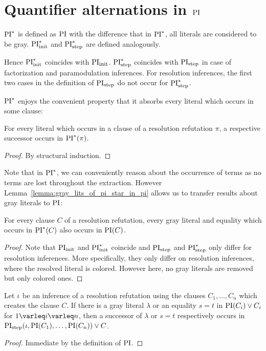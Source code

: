 \documentclass[%
	draft=false,%
	numbers=noendperiod,%
	11pt,%
	a4paper,%
	oneside,%
	openany,%
]{memoir}
\begin{document}
\section{Quantifier alternations in $\operatorname{PI}$}


\begin{defi}[$\PI^*$]
	$\PI^*$ is defined as $\operatorname{PI}$ with the difference that in $\PI^*$, all literals are considered to be gray.
	$\operatorname{PI}_{\mathrm{init}}^*$ and $\operatorname{PI}_{\mathrm{step}}^*$ are defined analogously.
\end{defi}

Hence $\operatorname{PI}_{\mathrm{init}}^*$ coincides with $\operatorname{PI}_{\mathrm{init}}$.
$\operatorname{PI}_{\mathrm{step}}^*$ coincides with $\operatorname{PI}_{\mathrm{step}}$ in case of factorization and paramodulation inferences.
For resolution inferences, the first two cases in the definition of $\operatorname{PI}_{\mathrm{step}}$ do not occur for $\operatorname{PI}_{\mathrm{step}}^*$.

$\PI^*$ enjoys the convenient property that it absorbs every literal which occurs in some clause:

\begin{prop}
	\label{prop:every_lit_in_pi_star}
	For every literal which occurs in a clause of a resolution refutation $\pi$, a respective successor occurs in $\operatorname{PI}^*(\pi)$.
\end{prop}
\begin{proof}
	By structural induction.
\end{proof}

Note that in $\PI^*$, we can conveniently reason about the occurrence of terms as no terms are lost throughout the extraction.
However Lemma~\ref{lemma:gray_lits_of_pi_star_in_pi} allows us to transfer results about gray literals to $\operatorname{PI}$:

\begin{lemma}
	\label{lemma:gray_lits_of_pi_star_in_pi}
	For every clause $C$ of a resolution refutation,
	every gray literal and equality which occurs in $\operatorname{PI}^*(C)$ also occurs in $\operatorname{PI}(C)$.
\end{lemma}
\begin{proof}
	Note that $\operatorname{PI}_{\mathrm{init}}$ and $\operatorname{PI}_{\mathrm{init}}^*$ coincide and $\operatorname{PI}_{\mathrm{step}}$ and $\operatorname{PI}_{\mathrm{step}}^*$ only differ for resolution inferences.
	More specifically, they only differ on resolution inferences, where the resolved literal is colored. However here, no gray literals are removed but only colored ones.
\end{proof}


\begin{lemma}
	\label{lemma:Ot8Gie7y}
	Let $\iota$ be an inference of a resolution refutation using the clauses $C_1, \dots, C_n$ which creates the clause $C$.
	If there is a gray literal $\lambda$ or an equality $s=t$ in $\operatorname{PI}(C_i) \lor C_i$ for $1 \varleq i \varleq n$, 
	then a successor of $\lambda$ or $s=t$ respectively occurs in $\operatorname{PI}_{\mathrm{step}}(\iota, \operatorname{PI}(C_1), \dots, \operatorname{PI}(C_n)) \lor C$.
\end{lemma}
\begin{proof}
	Immediate by the definition of $\operatorname{PI}$.
\end{proof}
\end{document}
